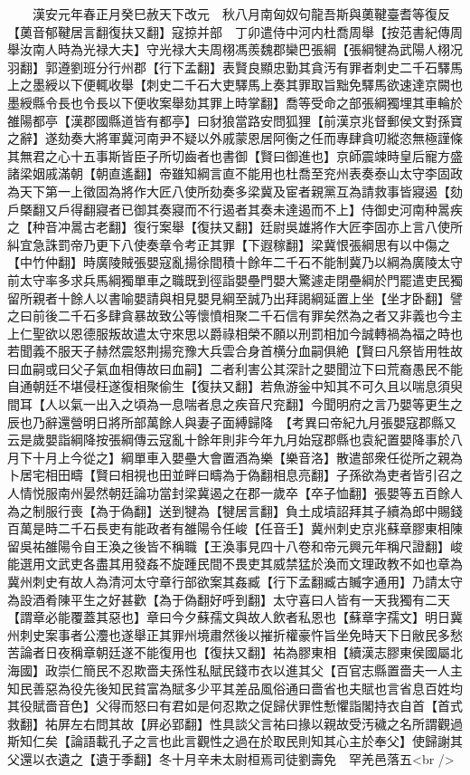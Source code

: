 　　漢安元年春正月癸巳赦天下改元　秋八月南匈奴句龍吾斯與薁鞬臺耆等復反【薁音郁鞬居言翻復扶又翻】寇掠并部　丁卯遣侍中河内杜喬周舉【按范書紀傳周舉汝南人時為光禄大夫】守光禄大夫周栩馮羨魏郡欒巴張綱【張綱犍為武陽人栩况羽翻】郭遵劉班分行州郡【行下孟翻】表賢良顯忠勤其貪汚有罪者刺史二千石驛馬上之墨綬以下便輒收舉【刺史二千石大吏驛馬上奏其罪取旨黜免驛馬欲速達京闕也墨綬縣令長也令長以下便收案舉劾其罪上時掌翻】喬等受命之部張綱獨埋其車輪於雒陽都亭【漢郡國縣道皆有都亭】曰豺狼當路安問狐狸【前漢京兆督郵侯文對孫寶之辭】遂劾奏大將軍冀河南尹不疑以外戚蒙恩居阿衡之任而專肆貪叨縱恣無極謹條其無君之心十五事斯皆臣子所切齒者也書御【賢曰御進也】京師震竦時皇后寵方盛諸梁姻戚滿朝【朝直遙翻】帝雖知綱言直不能用也杜喬至兖州表奏泰山太守李固政為天下第一上徵固為將作大匠八使所劾奏多梁冀及宦者親黨互為請救事皆寢遏【劾戶槩翻又戶得翻寢者已御其奏寢而不行遏者其奏未達遏而不上】侍御史河南种暠疾之【种音冲暠古老翻】復行案舉【復扶又翻】廷尉吳雄將作大匠李固亦上言八使所糾宜急誅罰帝乃更下八使奏章令考正其罪【下遐稼翻】梁冀恨張綱思有以中傷之【中竹仲翻】時廣陵賊張嬰寇亂揚徐間積十餘年二千石不能制冀乃以綱為廣陵太守前太守率多求兵馬綱獨單車之職既到徑詣嬰壘門嬰大驚遽走閉壘綱於門罷遣吏民獨留所親者十餘人以書喻嬰請與相見嬰見綱至誠乃出拜謁綱延置上坐【坐才卧翻】譬之曰前後二千石多肆貪暴故致公等懷憤相聚二千石信有罪矣然為之者又非義也今主上仁聖欲以恩德服叛故遣太守來思以爵祿相榮不願以刑罰相加今誠轉禍為福之時也若聞義不服天子赫然震怒荆揚兖豫大兵雲合身首横分血嗣俱絶【賢曰凡祭皆用牲故曰血嗣或曰父子氣血相傳故曰血嗣】二者利害公其深計之嬰聞泣下曰荒裔愚民不能自通朝廷不堪侵枉遂復相聚偷生【復扶又翻】若魚游釡中知其不可久且以喘息須臾間耳【人以氣一出入之頃為一息喘者息之疾音尺兖翻】今聞明府之言乃嬰等更生之辰也乃辭還營明日將所部萬餘人與妻子面縛歸降　【考異曰帝紀九月張嬰寇郡縣又云是歲嬰詣綱降按張綱傳云寇亂十餘年則非今年九月始寇郡縣也袁紀置嬰降事於八月下十月上今從之】綱單車入嬰壘大會置酒為樂【樂音洛】散遣部衆任從所之親為卜居宅相田疇【賢曰相視也田並畔曰疇為于偽翻相息亮翻】子孫欲為吏者皆引召之人情悦服南州晏然朝廷論功當封梁冀遏之在郡一歲卒【卒子恤翻】張嬰等五百餘人為之制服行喪【為于偽翻】送到犍為【犍居言翻】負土成墳詔拜其子續為郎中賜錢百萬是時二千石長吏有能政者有雒陽令任峻【任音壬】冀州刺史京兆蘇章膠東相陳留吳祐雒陽令自王渙之後皆不稱職【王渙事見四十八卷和帝元興元年稱尺證翻】峻能選用文武吏各盡其用發姦不旋踵民間不畏吏其威禁猛於渙而文理政教不如也章為冀州刺史有故人為清河太守章行部欲案其姦臧【行下孟翻臧古贓字通用】乃請太守為設酒肴陳平生之好甚歡【為于偽翻好呼到翻】太守喜曰人皆有一天我獨有二天【謂章必能覆蓋其惡也】章曰今夕蘇孺文與故人飲者私恩也【蘇章字孺文】明日冀州刺史案事者公灋也遂舉正其罪州境肅然後以摧折權豪忤旨坐免時天下日敝民多愁苦論者日夜稱章朝廷遂不能復用也【復扶又翻】祐為膠東相【續漢志膠東侯國屬北海國】政崇仁簡民不忍欺嗇夫孫性私賦民錢市衣以進其父【百官志縣置嗇夫一人主知民善惡為役先後知民貧富為賦多少平其差品風俗通曰嗇省也夫賦也言省息百姓均其役賦嗇音色】父得而怒曰有君如是何忍欺之促歸伏罪性慙懼詣閣持衣自首【首式救翻】祐屏左右問其故【屛必郢翻】性具談父言祐曰掾以親故受汚穢之名所謂觀過斯知仁矣【論語載孔子之言也此言觀性之過在於取民則知其心主於奉父】使歸謝其父還以衣遺之【遺于季翻】冬十月辛未太尉桓焉司徒劉壽免　罕羌邑落五<br />
